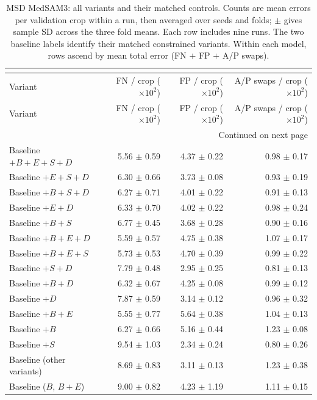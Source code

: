\documentclass[12pt,a4paper]{article}
\begin{document}
\begingroup\footnotesize{}
\setlength{\tabcolsep}{4pt}
\renewcommand{\arraystretch}{1.12}
\begin{longtable}{@{}lrrr@{}}
\caption{MSD MedSAM3: all variants and their matched controls. Counts are mean errors per validation crop within a run, then averaged over seeds and folds; $\pm$ gives sample SD across the three fold means. Each row includes nine runs. The two baseline labels identify their matched constrained variants. Within each model, rows ascend by mean total error (FN $+$ FP $+$ A/P swaps).}
\label{tab:medsam-msd-all-errors}\label{tab:medsam-noaug-errors}\label{tab:medsam-noaug-error-ledger}\\
\hline
Variant & \shortstack{FN / crop\\($\times 10^{2}$)} & \shortstack{FP / crop\\($\times 10^{2}$)} & \shortstack{A/P swaps / crop\\($\times 10^{2}$)} \\ \hline
\endfirsthead
\hline
Variant & \shortstack{FN / crop\\($\times 10^{2}$)} & \shortstack{FP / crop\\($\times 10^{2}$)} & \shortstack{A/P swaps / crop\\($\times 10^{2}$)} \\ \hline
\endhead
\hline
\multicolumn{4}{r}{Continued on next page}\\
\endfoot
\hline\endlastfoot
Baseline $+B+E+S+D$ & 5.56 $\pm$ 0.59 & 4.37 $\pm$ 0.22 & 0.98 $\pm$ 0.17 \\
Baseline $+E+S+D$ & 6.30 $\pm$ 0.66 & 3.73 $\pm$ 0.08 & 0.93 $\pm$ 0.19 \\
Baseline $+B+S+D$ & 6.27 $\pm$ 0.71 & 4.01 $\pm$ 0.22 & 0.91 $\pm$ 0.13 \\
Baseline $+E+D$ & 6.33 $\pm$ 0.70 & 4.02 $\pm$ 0.22 & 0.98 $\pm$ 0.24 \\
Baseline $+B+S$ & 6.77 $\pm$ 0.45 & 3.68 $\pm$ 0.28 & 0.90 $\pm$ 0.16 \\
Baseline $+B+E+D$ & 5.59 $\pm$ 0.57 & 4.75 $\pm$ 0.38 & 1.07 $\pm$ 0.17 \\
Baseline $+B+E+S$ & 5.73 $\pm$ 0.53 & 4.70 $\pm$ 0.39 & 0.99 $\pm$ 0.22 \\
Baseline $+S+D$ & 7.79 $\pm$ 0.48 & 2.95 $\pm$ 0.25 & 0.81 $\pm$ 0.13 \\
Baseline $+B+D$ & 6.32 $\pm$ 0.67 & 4.25 $\pm$ 0.08 & 0.99 $\pm$ 0.12 \\
Baseline $+D$ & 7.87 $\pm$ 0.59 & 3.14 $\pm$ 0.12 & 0.96 $\pm$ 0.32 \\
Baseline $+B+E$ & 5.55 $\pm$ 0.77 & 5.64 $\pm$ 0.38 & 1.04 $\pm$ 0.13 \\
Baseline $+B$ & 6.27 $\pm$ 0.66 & 5.16 $\pm$ 0.44 & 1.23 $\pm$ 0.08 \\
Baseline $+S$ & 9.54 $\pm$ 1.03 & 2.34 $\pm$ 0.24 & 0.80 $\pm$ 0.26 \\
Baseline (other variants) & 8.69 $\pm$ 0.83 & 3.11 $\pm$ 0.13 & 1.23 $\pm$ 0.38 \\
Baseline ($B$, $B+E$) & 9.00 $\pm$ 0.82 & 4.23 $\pm$ 1.19 & 1.11 $\pm$ 0.15 \\
\end{longtable}
\endgroup
\end{document}
